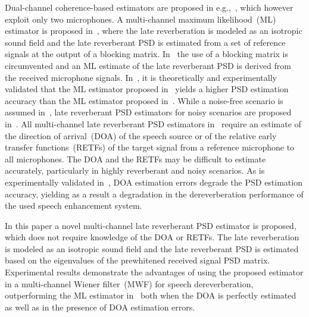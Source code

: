 \documentclass{article}
\begin{document}
Dual-channel coherence-based estimators are proposed in e.g.,~\cite{Thiergart_JASA_2012,ASchwarz_ITASLP_2015}, which however exploit only two microphones.
A multi-channel maximum likelihood~(ML) estimator is proposed in~\cite{Braun_EUSIPCO_2013}, where the late reverberation is modeled as an isotropic sound field and the late reverberant PSD is estimated from a set of reference signals at the output of a blocking matrix.
In~\cite{Kuklasinski_EUSIPCO_2014g} the use of a blocking matrix is circumvented and an ML estimate of the late reverberant PSD is derived from the received microphone signals.
In~\cite{Kuklasinksi_ICASSP_2015}, it is theoretically and experimentally validated that the ML estimator proposed in~\cite{Kuklasinski_EUSIPCO_2014g} yields a higher PSD estimation accuracy than the ML estimator proposed in~\cite{Braun_EUSIPCO_2013}.
While a noise-free scenario is assumed in~\cite{Kuklasinski_EUSIPCO_2014g}, late reverberant PSD estimators for noisy scenarios are proposed in~\cite{Braun_EUSIPCO_2013,Braun_EURASIP_2015,Schwartz_WASPAA_2015,Schwartz_ICASSP_2016,Kuklasinski_ITASLP_2016}.
All multi-channel late reverberant PSD estimators in~\cite{Braun_EUSIPCO_2013,Kuklasinski_EUSIPCO_2014g,Braun_EURASIP_2015,Schwartz_WASPAA_2015,Schwartz_ICASSP_2016,Kuklasinski_ITASLP_2016} require an estimate of the direction of arrival~(DOA) of the speech source or of the relative early transfer functions~(RETFs) of the target signal from a reference microphone to all microphones.
The DOA and the RETFs may be difficult to estimate accurately, particularly in highly reverberant and noisy scenarios.
As is experimentally validated in~\cite{ASchwarz_ITASLP_2015, kuklasinski_AES_2016}, DOA estimation errors degrade the PSD estimation accuracy, yielding as a result a degradation in the dereverberation performance of the used speech enhancement system.

In this paper a novel multi-channel late reverberant PSD estimator is proposed, which does not require knowledge of the DOA or RETFs. 
The late reverberation is modeled as an isotropic sound field and the late reverberant PSD is estimated based on the eigenvalues of the prewhitened received signal PSD matrix.
Experimental results demonstrate the advantages of using the proposed estimator in a multi-channel Wiener filter~(MWF) for speech dereverberation, outperforming the ML estimator in~\cite{Kuklasinski_EUSIPCO_2014g} both when the DOA is perfectly estimated as well as in the presence of DOA estimation errors. 

\end{document}
